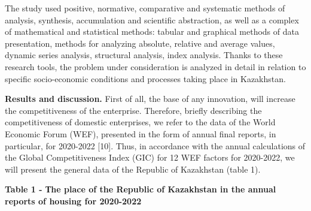 {{The study used positive, normative, comparative and systematic methods
of analysis, synthesis, accumulation and scientific abstraction, as well
as a complex of mathematical and statistical methods: tabular and
graphical methods of data presentation, methods for analyzing absolute,
relative and average values, dynamic series analysis, structural
analysis, index analysis. Thanks to these research tools, the problem
under consideration is analyzed in detail in relation to specific
socio-economic conditions and processes taking place in Kazakhstan.

{\bfseries Results and discussion.} First of all, the base of any
innovation, will increase the competitiveness of the enterprise.
Therefore, briefly describing the competitiveness of domestic
enterprises, we refer to the data of the World Economic Forum (WEF),
presented in the form of annual final reports, in particular, for
2020-2022 {[}10{]}. Thus, in accordance with the annual calculations of
the Global Competitiveness Index (GIC) for 12 WEF factors for 2020-2022,
we will present the general data of the Republic of Kazakhstan (table
1).

{\bfseries Table 1 - Тhe place of the Republic of Kazakhstan in the annual
reports of housing for 2020-2022}

}}
